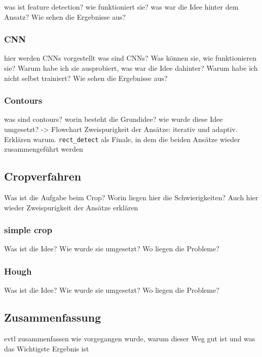 was ist feature detection?
wie funktioniert sie?
was war die Idee hinter dem Ansatz?
Wie sehen die Ergebnisse aus?

\subsubsection{CNN}

hier werden CNNs vorgestellt
was sind CNNs?
Was können sie, wie funktionieren sie?
Warum habe ich sie ausprobiert, was war die Idee dahinter?
Warum habe ich nicht selbst trainiert?
Wie sehen die Ergebnisse aus?

\subsubsection{Contours}

was sind contours?
worin besteht die Grundidee?
wie wurde diese Idee umgesetzt? -> Flowchart
Zweispurigkeit der Ansätze: iterativ und adaptiv. Erklären warum.
\verb|rect_detect| als Finale, in dem die beiden Ansätze wieder zusammengeführt werden

\subsection{Cropverfahren}

Was ist die Aufgabe beim Crop?
Worin liegen hier die Schwierigkeiten?
Auch hier wieder Zweispurigkeit der Ansätze erklären

\subsubsection{simple crop}

Was ist die Idee?
Wie wurde sie umgesetzt?
Wo liegen die Probleme?

\subsubsection{Hough}

Was ist die Idee?
Wie wurde sie umgesetzt?
Wo liegen die Probleme?

\subsection{Zusammenfassung}
evtl zusammenfassen wie vorgegangen wurde, warum dieser Weg gut ist und was das Wichtigste Ergebnis ist